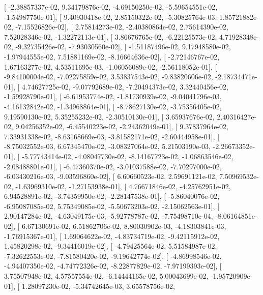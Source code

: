 \documentclass{article}
\begin{document}
       [ -2.38857337e-02,   9.34179876e-02,  -4.69150250e-02,
         -5.59654551e-02,  -1.54987750e-01],
       [  9.40930418e-02,   2.85150322e-02,  -5.30825764e-03,
          1.85721882e-02,  -7.15526826e-02],
       [  2.75814273e-02,  -2.40380864e-02,   2.75614390e-02,
          7.52028346e-02,  -1.32272113e-01],
       [  3.86676765e-02,  -6.22125573e-02,   4.71928348e-02,
         -9.32735426e-02,  -7.93030560e-02],
       [ -1.51187496e-02,   9.17948580e-02,  -1.97944555e-02,
          7.51881169e-02,  -8.16664636e-02],
       [ -2.72146767e-02,   1.67163277e-02,   4.53511695e-03,
         -1.06056089e-02,  -2.56118052e-01],
       [ -9.84100004e-02,  -7.02275859e-02,   3.53837543e-02,
         -9.83820606e-02,  -2.18734471e-01],
       [  4.74627725e-02,  -9.07792689e-02,  -7.20494373e-02,
          3.32440456e-02,  -1.59928790e-01],
       [ -6.61953774e-02,  -1.81730939e-02,  -9.04041796e-03,
         -4.16132842e-02,  -1.34968864e-01],
       [ -8.78627130e-02,  -3.75356405e-02,   9.19590130e-02,
          5.35255232e-02,  -2.30510130e-01],
       [  3.65937676e-02,   2.40316427e-02,   9.04256352e-02,
         -6.45540223e-02,  -2.24362049e-01],
       [  9.37837964e-02,   7.33931338e-02,  -8.63168669e-03,
         -3.81582171e-02,  -2.60444958e-01],
       [ -8.75032552e-03,   6.67345470e-02,  -3.08327064e-02,
          5.21503190e-03,  -2.26673352e-01],
       [ -5.77743414e-02,  -4.08047730e-02,  -8.14167723e-02,
         -1.06863546e-02,  -2.08488801e-01],
       [ -6.47360370e-02,  -3.01037588e-02,  -7.70297000e-02,
         -6.03430216e-03,  -9.03596860e-02],
       [  6.60660523e-02,   2.59691121e-02,   7.50969532e-02,
         -1.63969310e-02,  -1.27153938e-01],
       [  4.76671846e-02,  -4.25762951e-02,   6.94528891e-02,
         -3.74359950e-02,  -2.28147538e-01],
       [ -5.86040076e-02,  -6.95087085e-02,   5.75349085e-02,
         -5.50673203e-02,  -2.15062563e-01],
       [  2.90147284e-02,  -4.63049175e-03,  -5.92778787e-02,
         -7.75498710e-04,  -8.06164851e-02],
       [  6.67130691e-02,   6.51862706e-02,   8.80030902e-03,
         -4.18303841e-03,  -1.76915367e-01],
       [  1.69064622e-02,  -4.83734719e-02,  -9.42115912e-02,
          1.45820298e-02,  -9.34416019e-02],
       [ -4.79425564e-02,   5.51584987e-02,  -7.32622553e-02,
         -7.81580420e-02,  -9.19642774e-02],
       [ -4.86998546e-02,  -4.94407350e-02,  -4.74772326e-02,
         -8.22877829e-02,  -7.97199393e-02],
       [  3.75507948e-02,   4.57557554e-02,  -6.14444165e-02,
          5.00043699e-02,  -1.95720909e-01],
       [  1.28097230e-02,  -5.34742645e-03,   3.65578756e-02,
\end{document}
